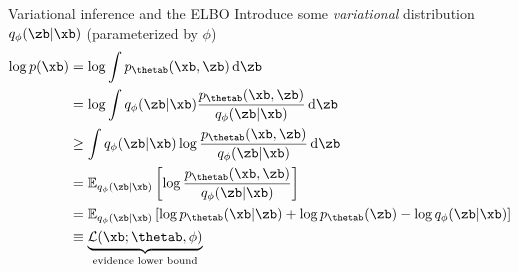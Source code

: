 \begin{frame}{Variational inference and the ELBO}
    Introduce some \textit{variational} distribution $q_\phi(\zb|\xb)$ (parameterized by $\phi$)
    \begin{align}
        \log p(\xb) &= \log \int p_\thetab(\xb,\zb) \,\text{d}\zb \notag \\
                    &= \log \int q_\phi(\zb|\xb) \frac{p_\thetab(\xb,\zb)}{q_\phi(\zb|\xb)} \,\text{d}\zb \notag \\
                    &\geq \int q_\phi(\zb|\xb) \log \frac{p_\thetab(\xb,\zb)}{q_\phi(\zb|\xb)} \,\text{d}\zb \notag \\
                    &= \mathbb{E}_{q_\phi(\zb|\xb)} \left[ \log \frac{p_\thetab(\xb,\zb)}{q_\phi(\zb|\xb)} \right] \notag \\
                    &= \mathbb{E}_{q_\phi(\zb|\xb)} \left[ \log p_\thetab(\xb|\zb) + \log p_\thetab(\zb) - \log q_\phi(\zb|\xb) \right] \notag\\
                    &\equiv \underbrace{\mathcal{L}(\xb;\thetab,\phi)}_{\text{evidence lower bound}}
    \end{align}
\end{frame}


